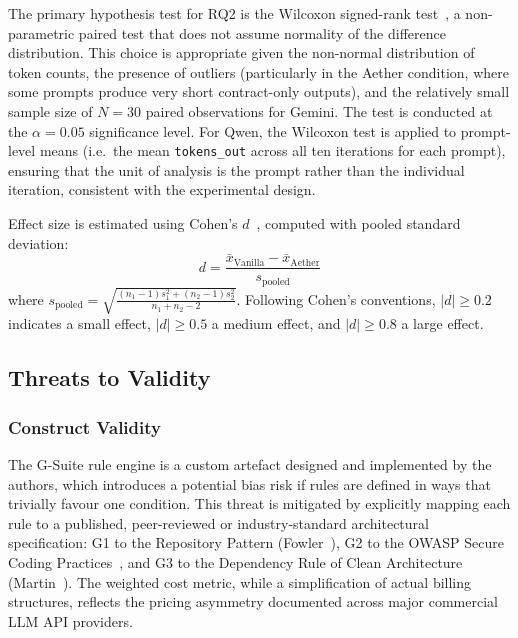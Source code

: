 \documentclass[review,12pt,3p]{elsarticle}
\begin{document}
The primary hypothesis test for RQ2 is the Wilcoxon signed-rank test~\citep{Wilcoxon1945},
a non-parametric paired test that does not assume normality of the difference distribution.
This choice is appropriate given the non-normal distribution of token counts, the presence
of outliers (particularly in the Aether condition, where some prompts produce very short
contract-only outputs), and the relatively small sample size of $N = 30$ paired observations
for Gemini. The test is conducted at the $\alpha = 0.05$ significance level. For Qwen, the
Wilcoxon test is applied to prompt-level means (i.e.\ the mean \texttt{tokens\_out} across
all ten iterations for each prompt), ensuring that the unit of analysis is the prompt rather
than the individual iteration, consistent with the experimental design.

Effect size is estimated using Cohen's $d$~\citep{Cohen1988}, computed with pooled standard
deviation:
\begin{equation}
  d = \frac{\bar{x}_{\text{Vanilla}} - \bar{x}_{\text{Aether}}}{s_{\text{pooled}}}
  \label{eq:cohens_d}
\end{equation}
where $s_{\text{pooled}} = \sqrt{\frac{(n_1 - 1)s_1^2 + (n_2 - 1)s_2^2}{n_1 + n_2 - 2}}$.
Following Cohen's conventions, $|d| \geq 0.2$ indicates a small effect, $|d| \geq 0.5$
a medium effect, and $|d| \geq 0.8$ a large effect.

\subsection{Threats to Validity}

\subsubsection{Construct Validity}

The G-Suite rule engine is a custom artefact designed and implemented by the authors, which
introduces a potential bias risk if rules are defined in ways that trivially favour one
condition. This threat is mitigated by explicitly mapping each rule to a published,
peer-reviewed or industry-standard architectural specification: G1 to the Repository Pattern
(Fowler~\citep{Fowler2002PEAA}), G2 to the OWASP Secure Coding Practices~\citep{OWASP2023Secure},
and G3 to the Dependency Rule of Clean Architecture (Martin~\citep{Martin2017CleanArch}).
The weighted cost metric, while a simplification of actual billing structures, reflects the
pricing asymmetry documented across major commercial LLM API providers.
\end{document}
